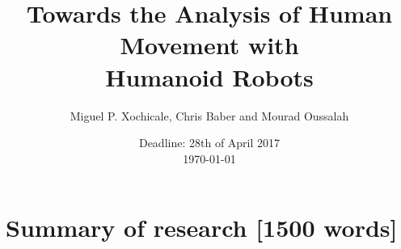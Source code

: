 \documentclass[a4paper]{article}
\title{Towards the Analysis of Human Movement with \\ Humanoid Robots}
\author{Miguel P. Xochicale, Chris Baber and Mourad Oussalah}
\date{Deadline: 28th of April 2017\\ \today }
\begin{document}
\maketitle
\thispagestyle{fancy}


\section*{Summary of research [1500 words]}

%
\end{document}
